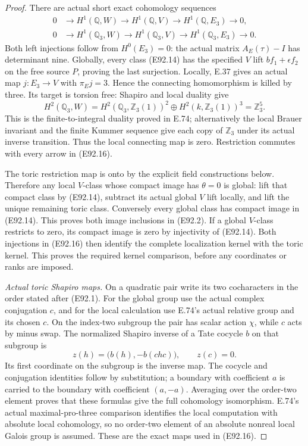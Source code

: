 \begin{proof}
There are actual short exact cohomology sequences
\[
\begin{aligned}
0&\longrightarrow H^1(\mathbb Q,W)
 \longrightarrow H^1(\mathbb Q,V)
 \longrightarrow H^1(\mathbb Q,E_3)\longrightarrow0,\\
0&\longrightarrow H^1(\mathbb Q_3,W)
 \longrightarrow H^1(\mathbb Q_3,V)
 \longrightarrow H^1(\mathbb Q_3,E_3)\longrightarrow0.
\end{aligned}
 \tag{E92.16}
\]
Both left injections follow from $H^0(E_3)=0$:
the actual matrix $A_E(\tau)-I$ has determinant
nine. Globally, every class (E92.14) has the
specified $V$ lift $bf_1+\epsilon f_2$ on the
free source $P$, proving the last surjection.
Locally, E.37 gives an actual map $j:E_3\to V$
with $\pi_Ej=3$. Hence the connecting homomorphism
is killed by three. Its target is torsion free:
Shapiro and local duality give
\[
       H^2(\mathbb Q_3,W)
       =H^2(\mathbb Q_3,\mathbb Z_3(1))^2
          \oplus H^2(k,\mathbb Z_3(1))^3
       =\mathbb Z_3^5.
 \tag{E92.17}
\]
This is the finite-to-integral duality proved
in E.74; alternatively the local Brauer invariant
and the finite Kummer sequence give each copy
of $\mathbb Z_3$ under its actual inverse transition.
Thus the local connecting map is zero. Restriction
commutes with every arrow in (E92.16).

The toric restriction map is onto by the explicit
field constructions below. Therefore any local
$V$-class whose compact image has $\theta=0$
is global: lift that compact class by (E92.14),
subtract its actual global $V$ lift locally,
and lift the unique remaining toric class.
Conversely every global class has compact
image in (E92.14). This proves both image
inclusions in (E92.2). If a global $V$-class
restricts to zero, its compact image is zero
by injectivity of (E92.14). Both injections
in (E92.16) then identify the complete
localization kernel with the toric kernel.
This proves the required kernel comparison,
before any coordinates or ranks are imposed.

\emph{Actual toric Shapiro maps.}
On a quadratic pair write its two cocharacters
in the order stated after (E92.1). For the
global group use the actual complex conjugation
$c$, and for the local calculation use E.74's
actual relative group and its chosen $c$.
On the index-two subgroup the pair has scalar
action $\chi$, while $c$ acts by minus swap.
The normalized Shapiro inverse of a Tate
cocycle $b$ on that subgroup is
\[
       z(h)=\bigl(b(h),-b(chc)\bigr),\qquad z(c)=0.
 \tag{E92.18}
\]
Its first coordinate on the subgroup is the
inverse map. The cocycle and conjugation
identities follow by substitution; a boundary
with coefficient $a$ is carried to the boundary
with coefficient $(a,-a)$. Averaging over the
order-two element proves that these formulas
give the full cohomology isomorphism. E.74's
actual maximal-pro-three comparison identifies
the local computation with absolute local
cohomology, so no order-two element of an
absolute nonreal local Galois group is assumed.
These are the exact maps used in (E92.16).


\end{proof}
